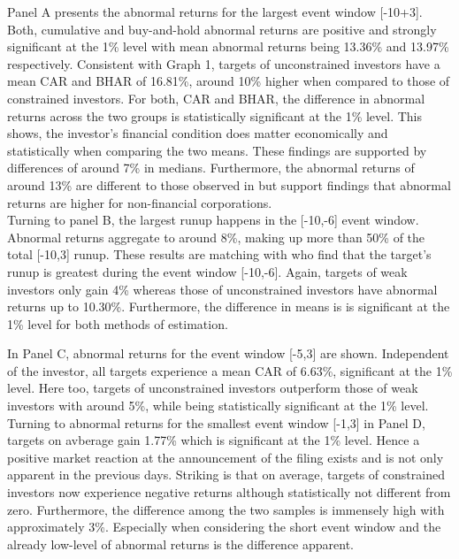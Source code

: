 \documentclass[12pt]{article}
\begin{document}

Panel A presents the abnormal returns for the largest event window [-10+3]. Both, cumulative and buy-and-hold abnormal returns are positive and strongly significant at the 1\% level with mean abnormal returns being 13.36\% and 13.97\% respectively. Consistent with Graph 1, targets of unconstrained investors have a mean CAR and BHAR of 16.81\%, around 10\% higher when compared to those of constrained investors. For both, CAR and BHAR, the difference in abnormal returns across the two groups is statistically significant at the 1\% level. This shows, the investor's financial condition does matter economically and statistically when comparing the two means. These findings are supported by differences of around 7\% in medians. Furthermore, the abnormal returns of around 13\% are different to those observed in \citet[p.208]{Klein2009} but support \citet[p.29]{Brigida2012} findings that abnormal returns are higher for non-financial corporations.\\
Turning to panel B, the largest runup happens in the [-10,-6] event window. Abnormal returns aggregate to around 8\%, making up more than 50\% of the total [-10,3] runup. These results are matching with \citet[p.32]{Brigida2012} who find that the target's runup is greatest during the event window [-10,-6]. Again, targets of weak investors only gain 4\% whereas those of unconstrained investors have abnormal returns up to 10.30\%. Furthermore, the difference in means is is significant at the 1\% level for both methods of estimation.

In Panel C, abnormal returns for the event window [-5,3] are shown. Independent of the investor, all targets experience a mean CAR of 6.63\%, significant at the 1\% level. Here too, targets of unconstrained investors outperform those of weak investors with around 5\%, while being statistically significant at the 1\% level. \\
Turning to abnormal returns for the smallest event window [-1,3] in Panel D, targets on avberage gain 1.77\% which is significant at the 1\% level. Hence a positive market reaction at the announcement of the filing exists and is not only apparent in the previous days. Striking is that on average, targets of constrained investors now experience negative returns although statistically not different from zero. Furthermore, the difference among the two samples is immensely high with approximately 3\%. Especially when considering the short event window and the already low-level of abnormal returns is the difference apparent.
\end{document}
